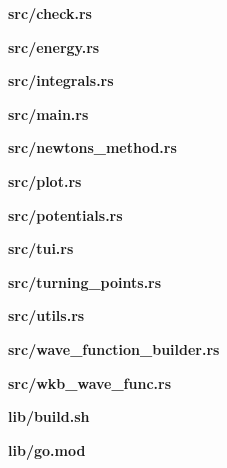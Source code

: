 \documentclass[11pt,DIV=10,final]{scrreprt} %
\begin{document}
{\begin{appendix}
\vspace*{3ex}
{\noindent \large \bfseries src/check.rs}


\vspace*{3ex}
{\noindent \large \bfseries src/energy.rs}


\vspace*{3ex}
{\noindent \large \bfseries src/integrals.rs}


\vspace*{3ex}
{\noindent \large \bfseries src/main.rs}


\vspace*{3ex}
{\noindent \large \bfseries src/newtons\_method.rs}


\vspace*{3ex}
{\noindent \large \bfseries src/plot.rs}


\vspace*{3ex}
{\noindent \large \bfseries src/potentials.rs}


\vspace*{3ex}
{\noindent \large \bfseries src/tui.rs}


\vspace*{3ex}
{\noindent \large \bfseries src/turning\_points.rs}


\vspace*{3ex}
{\noindent \large \bfseries src/utils.rs}


\vspace*{3ex}
{\noindent \large \bfseries src/wave\_function\_builder.rs}


\vspace*{3ex}
{\noindent \large \bfseries src/wkb\_wave\_func.rs}


\vspace*{3ex}
{\noindent \large \bfseries lib/build.sh}


\vspace*{3ex}
{\noindent \large \bfseries lib/go.mod}



\end{appendix}}
\end{document}
